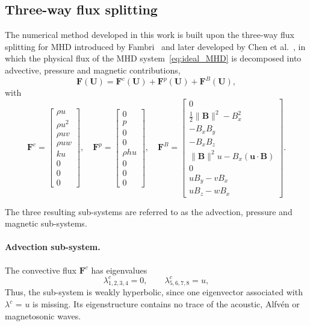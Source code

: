\documentclass[a4paper,fleqn]{cas-sc}
\theoremstyle{remark}
\begin{document}
\subsection{Three-way flux splitting}
\label{sec:3split}

The numerical method developed in this work is built upon the three-way flux splitting for MHD introduced by Fambri~\cite{Fambri2021} and later developed by Chen et al.~\cite{MHDIMEX}, in which the physical flux of the MHD system~\eqref{eq:ideal_MHD} is decomposed into advective, pressure and magnetic contributions,
\begin{equation}
\mathbf{F}(\mathbf{U}) = \mathbf{F}^c(\mathbf{U}) + \mathbf{F}^p(\mathbf{U}) + \mathbf{F}^B(\mathbf{U}),
\end{equation}
with
\begin{equation}
\mathbf{F}^c =
\begin{bmatrix}
\rho u \\
\rho u^2 \\
\rho uv \\
\rho uw \\
k u \\
0 \\
0 \\
0
\end{bmatrix},\quad
\mathbf{F}^p =
\begin{bmatrix}
0 \\
p \\
0 \\
0 \\
\rho h u \\
0 \\
0 \\
0
\end{bmatrix},\quad
\mathbf{F}^B =
\begin{bmatrix}
0 \\
\frac{1}{2}\|\mathbf{B}\|^2 - B_x^2 \\
-B_xB_y \\
-B_xB_z \\
\|\mathbf{B}\|^2u - B_x(\mathbf{u}\cdot\mathbf{B}) \\
0 \\
uB_y - vB_x \\
uB_z - wB_x
\end{bmatrix}.
\end{equation}


The three resulting sub-systems are referred to as the advection, pressure and magnetic sub-systems.

\paragraph{Advection sub-system.}
The convective flux $\mathbf{F}^c$ has eigenvalues
\begin{equation}
\label{eq:adv_eigs}
\lambda^c_{1,2,3,4}=0,\qquad \lambda^c_{5,6,7,8}=u,
\end{equation}
Thus, the sub-system is weakly hyperbolic, since one eigenvector associated with $\lambda^c$ = $u$ is missing. Its eigenstructure contains no trace of the acoustic, Alfvén or magnetosonic waves.
\end{document}
